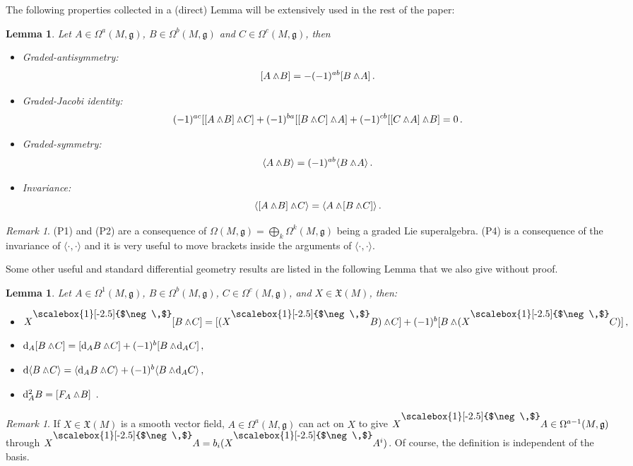 \documentclass[12pt]{amsart}
\theoremstyle{plain}
\newtheorem{lemma}[theorem]{Lemma}
\theoremstyle{definition}
\theoremstyle{remark}
\newtheorem{remark}[theorem]{Remark}
\newcommand{\iprod}{\raisebox{8pt}{\scalebox{1}[-2.5]{$\neg\,$}}}
\newcommand{\wed}{\wedge\hspace*{-7.5pt}.\hspace*{3pt}}
\numberwithin{equation}{section}  %
\begin{document}
The following properties collected in a (direct) Lemma will be extensively used in the rest of the paper:

\begin{lemma}\label{primer_lema} Let $A\in\Omega^a(M,\mathfrak{g})$, $B\in\Omega^b(M,\mathfrak{g})$ and $C\in\Omega^c(M,\mathfrak{g})$, then 
\begin{itemize}
    \item[(P1)] Graded-antisymmetry: \[\displaystyle[ A\wed B]=-(-1)^{ab} [B\wed A]\,.\]
    \item[(P2)] Graded-Jacobi identity: \[ \displaystyle (-1)^{ac}[ [A \wed B]\wed C]+(-1)^{ba}[ [ B \wed C]\wed A]+(-1)^{cb}[ [ C \wed A]\wed B]=0 \,.\]  
    \item[(P3)] Graded-symmetry: \[\displaystyle\langle A\wed B\rangle = (-1)^{ab}\langle B\wed A\rangle\,.\]
    \item[(P4)] Invariance: \[\langle[A\wed B]\wed C\rangle=\langle A\wed [B\wed C]\rangle\,.\]
\end{itemize}


\end{lemma}

\begin{remark}
(P1) and (P2) are a consequence of $\Omega(M,\mathfrak{g})=\bigoplus_k \Omega^k(M,\mathfrak{g})$ being a graded Lie superalgebra. (P4) is a consequence of the invariance of $\langle\cdot,\!\cdot\rangle$ and it is very useful to move brackets inside the arguments of  $\langle\cdot,\!\cdot\rangle$.
\end{remark}


\noindent Some other useful and standard differential geometry results are listed in the following Lemma that we also give without proof.
\begin{lemma}
Let $A\in \Omega^1(M,\mathfrak{g})$, $B\in\Omega^b(M,\mathfrak{g})$, $C\in\Omega^c(M,\mathfrak{g})$, and $X\in\mathfrak{X}(M)$, then:
\begin{itemize}
    \item[(P5)]  \(X\iprod [B\wed C]=[(X\iprod B)\wed C]+(-1)^b[B\wed (X\iprod C)]\,,\)

\vspace*{-.5mm}
    
    \item[(P6)]  \(\mathrm{d}_A[B\wed C]=[\mathrm{d}_AB\wed C]+(-1)^b[B\wed \mathrm{d}_AC]\,,\phantom{\big{|}}\)
    \item[(P7)] \( \mathrm{d}\langle B\wed C\rangle=\langle \mathrm{d}_A B\wed C\rangle+(-1)^b\langle B\wed \mathrm{d}_AC\rangle \,,\phantom{\big{|}}\)
    \item[(P8)] \(\mathrm{d}_A^2 B=[F_A\wed B]\phantom{\big{|}}\,.\)
\end{itemize}
\end{lemma}
\begin{remark}
    If $X\in\mathfrak{X}(M)$ is a smooth vector field, $A\in\Omega^a(M,\mathfrak{g})$ can act on $X$ to give $X\iprod A\in \Omega^{a-1}(M,\mathfrak{g})$  through $X\iprod A=b_i (X\iprod A^i)$. Of course, the definition is independent of the basis. 
\end{remark}
\end{document}

